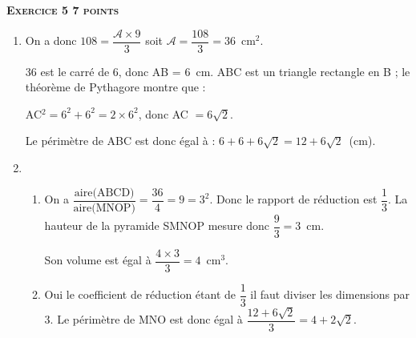 \textbf{\textsc{Exercice 5 \hfill 7 points}}

\medskip

% 
% 
% 

\begin{enumerate}
\item %
On a donc $108 = \dfrac{\mathcal{A} \times 9}{3} $ soit $\mathcal{A} = \dfrac{108}{3} = 36$~cm$^2$.

36 est le carré de 6, donc AB = 6~cm. 
ABC est un triangle rectangle en B ; le théorème de Pythagore montre que :

AC$^2 = 6^2 + 6^2 = 2\times 6^2$, donc AC $ = 6\sqrt{2}$.

Le périmètre de ABC est donc égal à : $6 + 6 + 6\sqrt{2} = 12 + 6\sqrt{2}$~(cm).
\item  %
 
	\begin{enumerate}
		\item %
On a $\dfrac{\text{aire(ABCD)}}{\text{aire(MNOP)}} = \dfrac{36}{4} = 9 = 3^2$. Donc le rapport de réduction est $\dfrac{1}{3}$. La hauteur de la pyramide SMNOP mesure donc $\dfrac{9}{3} = 3$~cm.

Son volume est égal à $\dfrac{4 \times 3}{3} = 4 $~cm$^3$.  
		\item %

 
Oui le coefficient de réduction étant de $\dfrac{1}{3}$ il faut diviser les dimensions par 3.
Le périmètre de MNO est donc égal à $\dfrac{12 + 6\sqrt{2}}{3} = 4 + 2\sqrt{2}$.
	\end{enumerate} 
\end{enumerate}
